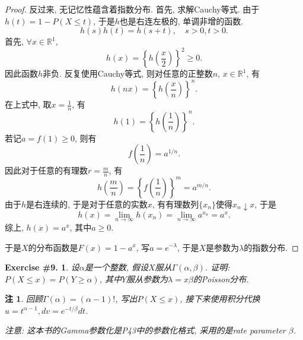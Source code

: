 \documentclass[UTF8, a4paper]{article}
\newtheorem{exercise}{Exercise \#9.}
\newtheorem*{remark}{注}
\begin{document}
\begin{proof}
反过来, 无记忆性蕴含着指数分布.
首先, 求解Cauchy等式.
由于\(h(t) = 1 - P(X \leq t)\), 于是\(h\)也是右连左极的, 单调非增的函数.
$$
h(s)h(t) = h(s + t), \quad s > 0, t > 0.
$$
首先, \(\forall x \in \mathbb{R}^1\), 
$$
h(x) = \left\{h\left(\frac{x}{2}\right)\right\}^2 \geq 0.
$$
因此函数\(h\)非负. 反复使用Cauchy等式, 则对任意的正整数\(n\), \(x\in \mathbb{R}^1\), 有
$$
h(nx) = \left\{h\left(\frac{x}{n}\right)\right\}^n.
$$
在上式中, 取\(x = \frac{1}{n}\), 有
$$
h(1) = \left\{h\left(\frac{1}{n}\right)\right\}^n.
$$
若记\(a = f(1) \geq 0\), 则有 
$$
f\left(\frac{1}{n}\right) = a^{1/n}.
$$
因此对于任意的有理数\(r = \frac{m}{n}\), 有
$$
h\left(\frac{m}{n}\right) = \left\{f\left(\frac{1}{n}\right)\right\}^m = a^{m/n}.
$$
由于\(h\)是右连续的, 于是对于任意的实数\(x\), 有有理数列\(\{x_n\}\)使得\(x_n \downarrow x\), 于是
$$
h(x) = \lim_{n\to \infty} h(x_n) = \lim_{n\to \infty} a^{x_n} = a^x.
$$
综上, \(h(x) = a^x\), 其中\(a \geq 0\).

于是\(X\)的分布函数是\(F(x) = 1 - a^x\), 
写\(a = e^{-\lambda}\), 
于是\(X\)是参数为\(\lambda\)的指数分布.
\end{proof}

\begin{framed}
\begin{exercise}
设\(\alpha\)是一个整数, 假设\(X\)服从\(\Gamma(\alpha, \beta)\).
证明: \(P(X \leq x) = P(Y\geq \alpha)\), 其中\(Y\)服从参数为\(\lambda = x\beta\)的Poisson分布.
\end{exercise}
\end{framed}

\begin{remark}
回顾\(\Gamma(\alpha) = (\alpha - 1)!\), 写出\(P(X \leq x)\), 
接下来使用积分代换\(u = t^{\alpha - 1}, dv = e^{-t/\beta}dt\).

注意: 这本书的Gamma参数化是P43中的参数化格式, 采用的是rate parameter \(\beta\).
\end{remark}
\end{document}
